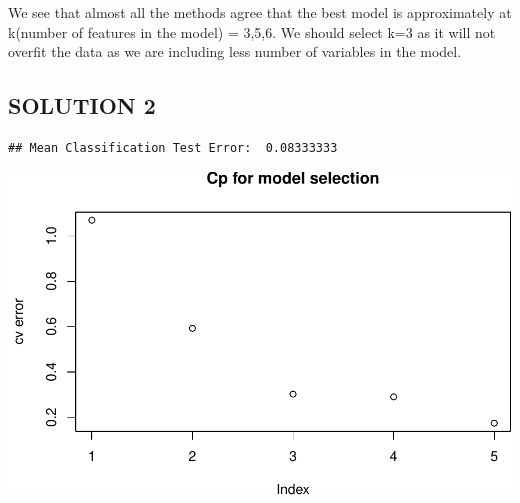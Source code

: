 \documentclass[]{article}
\begin{document}
We see that almost all the methods agree that the best model is
approximately at k(number of features in the model) = 3,5,6. We should
select k=3 as it will not overfit the data as we are including less
number of variables in the model.

\subsection{SOLUTION 2}\label{solution-2}

\begin{verbatim}
## Mean Classification Test Error:  0.08333333
\end{verbatim}

\includegraphics{HW4_Solution_files/figure-latex/unnamed-chunk-5-1.pdf}

~
\end{document}
